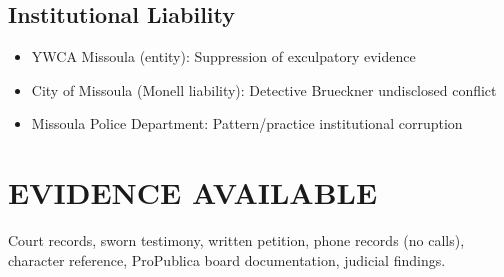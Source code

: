 \documentclass[12pt,oneside]{article}
\begin{document}
\subsection*{Institutional Liability}

\begin{itemize}

\item YWCA Missoula (entity): Suppression of exculpatory evidence

\item City of Missoula (Monell liability): Detective Brueckner undisclosed conflict

\item Missoula Police Department: Pattern/practice institutional corruption

\end{itemize}

\section*{EVIDENCE AVAILABLE}

Court records, sworn testimony, written petition, phone records (no calls), character reference, ProPublica board documentation, judicial findings.
\end{document}
